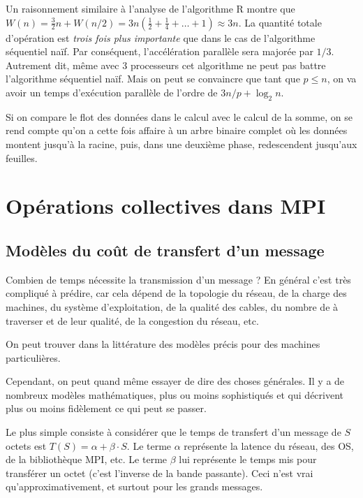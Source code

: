 Un raisonnement similaire à l'analyse de l'algorithme R montre que
$W(n) = \frac{3}{2}n + W(n/2) = 3n \left( \frac{1}{2} + \frac{1}{4} + \dots +
  1\right) \approx 3n$. La quantité totale d'opération est \emph{trois fois plus
  importante} que dans le cas de l'algorithme séquentiel naïf. Par conséquent,
l'accélération parallèle sera majorée par $1/3$. Autrement dit, même avec 3
processeurs cet algorithme ne peut pas battre l'algorithme séquentiel naïf. Mais
on peut se convaincre que tant que $p \leq n$, on va avoir un temps d'exécution
parallèle de l'ordre de $3n/p + \log_2 n$.

Si on compare le flot des données dans le calcul avec le calcul de la somme, on
se rend compte qu'on a cette fois affaire à un arbre binaire complet où les
données montent jusqu'à la racine, puis, dans une deuxième phase, redescendent
jusqu'aux feuilles.


\section{Opérations collectives dans MPI}

\subsection{Modèles du coût de transfert d'un message}

Combien de temps nécessite la transmission d'un message ? En général
c'est très compliqué à prédire, car cela dépend de la topologie du
réseau, de la charge des machines, du système d'exploitation, de la
qualité des cables, du nombre de  à traverser et de
leur qualité, de la congestion du réseau, etc.

On peut trouver dans la littérature des modèles précis pour des
machines particulières.

Cependant, on peut quand même essayer de dire des choses générales. Il y a de
nombreux modèles mathématiques, plus ou moins sophistiqués et qui décrivent plus
ou moins fidèlement ce qui peut se passer.

Le plus simple consiste à considérer que le temps de transfert d'un message de
$S$ octets est $T(S) = \alpha + \beta \cdot S$. Le terme $\alpha$ représente la
latence du réseau, des OS, de la bibliothèque MPI, etc. Le terme $\beta$ lui
représente le temps mis pour transférer un octet (c'est l'inverse de la bande
passante). Ceci n'est vrai qu'approximativement, et surtout pour les grands
messages. %

